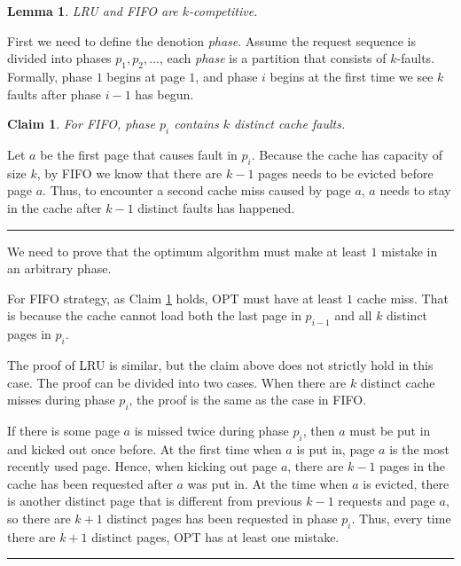 \documentclass[11pt]{article}
\newenvironment{proof}{{\bf Proof:  }}{\hfill\rule{2mm}{2mm}}
\newenvironment{proofof}[1]{{\bf Proof of #1:  }}{\hfill\rule{2mm}{2mm}}
\newtheorem{lemma}[fact]{Lemma}
\newtheorem{claim}[fact]{Claim}
\begin{document}
\begin{lemma}
	LRU and FIFO are $k$-competitive\cite{sleator1985amortized}.
	\label{lemma1}
\end{lemma}

First we need to define the denotion {\em phase}. Assume the request sequence is divided into phases $p_1, p_2, \dots$, each {\em phase} is a partition that consists of $k$-faults. Formally, phase $1$ begins at page $1$, and phase $i$ begins at the first time we see $k$ faults after phase $i-1$ has begun. 
	
\begin{claim}
	For FIFO, phase $p_i$ contains $k$ distinct cache faults\cite{komm2016introduction}.
	\label{claim1}
\end{claim}

\begin{proof}
	Let $a$ be the first page that causes fault in $p_i$. Because the cache has capacity of size $k$, by FIFO we know that there are $k-1$ pages needs to be evicted before page $a$. Thus, to encounter a second cache miss caused by page $a$, $a$ needs to stay in the cache after $k-1$ distinct faults has happened.
\end{proof}

\begin{proofof}{Lemma \ref{lemma1}}
	We need to prove that the optimum algorithm must make at least $1$ mistake in an arbitrary phase.
	
	For FIFO strategy, as Claim \ref{claim1} holds, OPT must have at least $1$ cache miss. That is because the cache cannot load both the last page in $p_{i-1}$ and all $k$ distinct pages in $p_i$.
	
	The proof of LRU is similar, but the claim above does not strictly hold in this case. The proof can be divided into two cases. When there are $k$ distinct cache misses during phase $p_i$, the proof is the same as the case in FIFO.
	
	If there is some page $a$ is missed twice during phase $p_i$, then $a$ must be put in and kicked out once before. At the first time when $a$ is put in, page $a$ is the most recently used page. Hence, when kicking out page $a$, there are $k-1$ pages in the cache has been requested after $a$ was put in. At the time when $a$ is evicted, there is another distinct page that is different from previous $k-1$ requests and page $a$, so there are $k+1$ distinct pages has been requested in phase $p_i$. Thus, every time there are $k+1$ distinct pages, OPT has at least one mistake.
\end{proofof}
\end{document}
